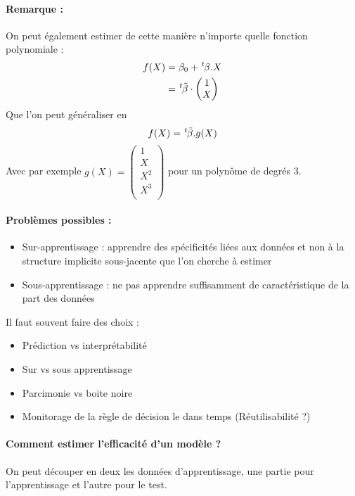 \documentclass{article}
\newcommand{\transpose}{\hspace{.1em}{}^t\hspace{-.1em}}
\begin{document}
\paragraph{Remarque :} On peut également estimer de cette manière  n'importe quelle fonction polynomiale :
\begin{align*}
f(X) & = \beta_0 + \transpose \beta.X\\
& = \transpose\tilde{\beta}\cdot \begin{pmatrix}
1 \\ X\\
\end{pmatrix}
\end{align*}
Que l'on peut généraliser en 
\[f(X) = \transpose \tilde{\beta} . g(X)\]
Avec par exemple $g(X) = \begin{pmatrix}
1\\X\\X^2\\X^3\\
\end{pmatrix}$ pour un polynôme de degrés 3.

\paragraph{Problèmes possibles :}
\begin{itemize}
\item Sur-apprentissage : apprendre des spécificités liées aux données et non à la structure implicite sous-jacente que l'on cherche à estimer
\item Sous-apprentissage :  ne pas apprendre suffisamment de caractéristique de la part des données
\end{itemize}
\bigskip


Il faut souvent faire des choix :
\begin{itemize}
\item Prédiction vs interprétabilité
\item Sur vs sous apprentissage 
\item Parcimonie vs boite noire
\item Monitorage de la règle de décision le dans temps (Réutilisabilité ?)
\end{itemize}


\paragraph{Comment estimer l'efficacité d'un modèle ?} On peut découper en deux les données d'apprentissage, une partie pour l'apprentissage et l'autre pour le test.
\end{document}
